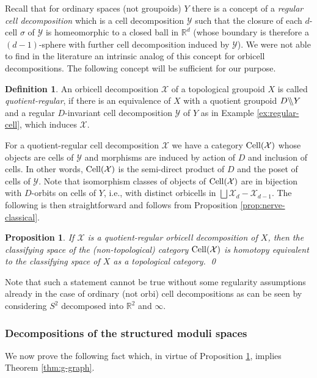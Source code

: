 \documentclass[english,11pt,leqno]{article}
\def\RR{\mathbb{R}}
\def\Xc{\mathcal{X}}
\def\Yc{\mathcal{Y}}
\def\bbs{{\backslash\hskip -1mm \backslash}}
\def\bbs{\backslash \hskip -.1cm \backslash}
\def\Yc{{\mathcal Y}}
\newtheorem{prop}[thm]{Proposition}
\theoremstyle{definition}
\newtheorem{defi}[thm]{Definition}
\theoremstyle{remark}
\numberwithin{equation}{section}
\begin{document}
  Recall that for ordinary spaces (not groupoids) $Y$ there is a concept of a {\em regular cell decomposition}
  which is a cell decomposition $\Yc$ such that the closure of each $d$-cell $\sigma$ of $\Yc$ is
  homeomorphic to a closed ball in $\RR^d$ (whose boundary is therefore a $(d-1)$-sphere with
  further cell decomposition induced by $\Yc$). We were not able to find in the literature an
  intrinsic analog of this concept for orbicell decompositions. The following concept will be sufficient
  for our purpose.
  
  \begin{defi}
  An orbicell decomposition $\Xc$ of a topological groupoid $X$ is called {\em quotient-regular},
  if there is an equivalence of $X$ with a quotient groupoid $D\bbs Y$ and a regular $D$-invariant
  cell decomposition $\Yc$ of $Y$ as in Example \ref{ex:regular-cell}, which induces $\Xc$. 
  \end{defi}
  
  For a quotient-regular cell decomposition $\Xc$ we have a category $\Cell(\Xc)$ whose objects
  are cells of $\Yc$ and morphisms are induced by action of $D$ and inclusion of cells.
  In other words, $\Cell(\Xc)$ is the semi-direct product of $D$ and the poset of cells of $\Yc$.
  Note that isomorphism classes of objects of $\Cell(\Xc)$ are in bijection with $D$-orbits on cells
  of $Y$, i.e., with distinct orbicells in $\bigsqcup \Xc_d- \Xc_{d-1}$. The following is then straightforward
  and follows from Proposition \ref{prop:nerve-classical}. 
  
  \begin{prop}\label{prop:orbicell-cell}
  If $\Xc$ is a quotient-regular orbicell decomposition of $X$, then the classifying space
  of the (non-topological) category $\Cell(\Xc)$ is homotopy equivalent to the classifying space of $X$ as a topological
  category. \qed
  \end{prop}
  
  
  Note that such a statement cannot be true without some regularity assumptions already in the case of
  ordinary (not orbi) cell decompositions as can be seen by considering $S^2$ decomposed into $\RR^2$ and $\infty$. 
  
\subsubsection{Decompositions of the structured moduli spaces}\label{sub sub:decom-str}

We now prove the following fact which, in virtue of Proposition 
\ref {prop:orbicell-cell}, implies Theorem \ref{thm:g-graph}. 
\end{document}
